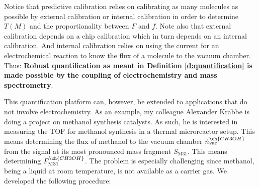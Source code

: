 Notice that predictive calibration relies on calibrating as many molecules as possible by external calibration or internal calibration in order to determine $T(M)$ and the proportionality between $F$ and $f$. Note also that external calibration depends on a chip calibration which in turn depends on an internal calibration. And internal calibration relies on using the current for an electrochemical reaction to know the flux of a molecule to the vacuum chamber. Thus: \textbf{Robust quantification as meant in Definition \ref{d:quantification} is made possible by the coupling of electrochemistry and mass spectrometry}.

This quantification platform can, however, be extended to applications that do not involve electrochemistry. As an example, my colleague Alexander Krabbe is doing a project on methanol synthesis catalysts. As such, he is interested in measuring the TOF for methanol synthesis in a thermal microreactor setup. This means determining the flux of methanol to the vacuum chamber $\dot{n}_\text{vac}^{\ch{CH3OH}}$ from the signal at its most pronounced mass fragment $S_\text{M31}$. This means determining $F_\text{M31}^{\ch{CH3OH}}$. The problem is especially challenging since methanol, being a liquid at room temperature, is not available as a carrier gas. We developed the following procedure:

